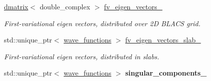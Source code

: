 \begin{DoxyCompactItemize}
\hyperlink{classsddk_1_1dmatrix}{dmatrix}$<$ double\+\_\+complex $>$ \hyperlink{classsirius_1_1_k__point_a4dce601feff0bf4382d7089ee88cf9ea}{fv\+\_\+eigen\+\_\+vectors\+\_\+}
\begin{DoxyCompactList}\small\item\em First-\/variational eigen vectors, distributed over 2\+D B\+L\+A\+C\+S grid. \end{DoxyCompactList}\item 
std\+::unique\+\_\+ptr$<$ \hyperlink{classsddk_1_1wave__functions}{wave\+\_\+functions} $>$ \hyperlink{classsirius_1_1_k__point_a0fcc8ce86cb2b8fa713b1101fadd8098}{fv\+\_\+eigen\+\_\+vectors\+\_\+slab\+\_\+}
\begin{DoxyCompactList}\small\item\em First-\/variational eigen vectors, distributed in slabs. \end{DoxyCompactList}\item 
\hypertarget{classsirius_1_1_k__point_a009f9a44017f407b8bbc5ae0c50099ec}{}std\+::unique\+\_\+ptr$<$ \hyperlink{classsddk_1_1wave__functions}{wave\+\_\+functions} $>$ {\bfseries singular\+\_\+components\+\_\+}\label{classsirius_1_1_k__point_a009f9a44017f407b8bbc5ae0c50099ec}


\end{DoxyCompactItemize}
